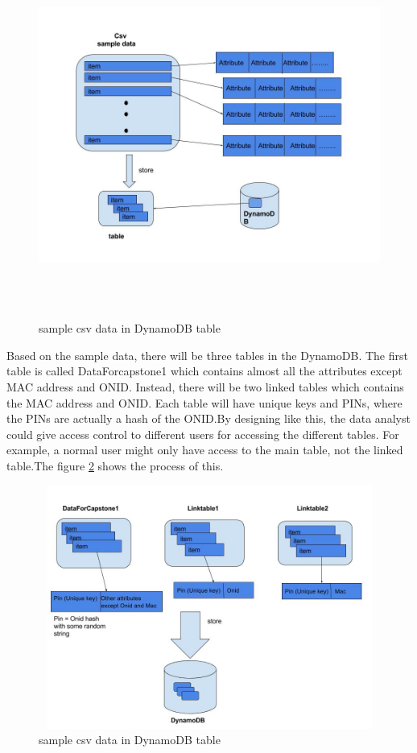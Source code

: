 \begin{figure}[H]
\includegraphics[width=15cm, height=12cm]{11.jpg}
\centering
\caption{\label{fig:1}sample csv data in DynamoDB table}
\end{figure}
 
	\noindent Based on the sample data, there will be three tables in the DynamoDB. The first table is called DataForcapstone1 which contains almost all the attributes except MAC address and ONID. Instead, there will be two linked tables which contains the MAC address and ONID. Each table will have unique keys and PINs, where the PINs are actually a hash of the ONID.By designing like this, the data analyst could give access control to different users for accessing the different tables. For example, a normal user might only have access to the main table, not the linked table.The figure \ref{fig:3} shows the process of this.

\begin{figure}[H]
\includegraphics[width=15cm, height=8cm]{7.jpg}
\centering
\caption{\label{fig:3}sample csv data in DynamoDB table}
\end{figure}
	
